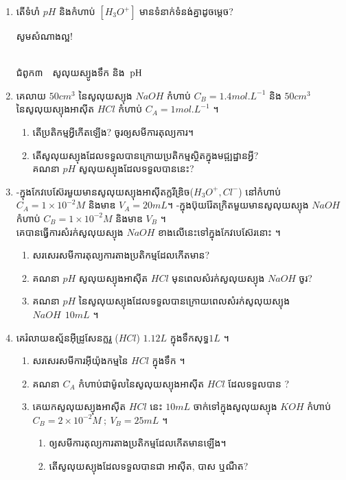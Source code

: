 \documentclass[12pt, a4paper]{article}
\begin{document}
\begin{enumerate}[m]
	\item តើទំហំ $pH$ និងកំហាប់ $\left[H_{3}O^{+}\right]$ មានទំនាក់ទំនង់គ្នាដូចម្តេច?   
	\begin{center}
		\sffamily\color{black}
		សូមសំណាងល្អ!
	\end{center}\newpage
		\begin{center}
			\sffamily\color{black}
			\\
			ជំពូក៣~~សូលុយស្យូងទឹក និង~$\ce{pH}$
		\end{center}
	\item គេលាយ $50cm^3$ នៃសូលុយស្យុង $NaOH$ កំហាប់ $C_B=1.4mol.L^{-1}$ និង $50cm^3$ នៃសូលុយស្យុងអាស៊ីត $HCl$ កំហាប់ $C_A=1mol.L^{-1}$ ។
	\begin{enumerate}[k]
		\item តើប្រតិកម្មអ្វីកើតឡើង? ចូរឲ្យសមីការតុល្យការ។
		\item តើសូលុយស្យុងដែលទទួលបានក្រោយប្រតិកម្មស្ថិតក្នុងមជ្ឍដ្ឋានអ្វី?\\
		គណនា $pH$ សូលុយស្យុងដែលទទួលបាននេះ?
	\end{enumerate}
	\item -ក្នុងកែវបេស៊ែរមួយមានសូលុយស្យុងអាស៊ីតក្លរីឌ្រិច($H_3O^+, Cl^-$) នៅកំហាប់ $C_A=1\times10^{-2}M$ និងមាឌ $V_A=20mL$។
	-ក្នុងប៊ុយរ៉ែតក្រិតមួយមានសូលុយស្យុង $NaOH$ កំហាប់ $C_B=1\times10^{-2}M$ និងមាឌ $V_B$ ។\\
	គេបានធ្វើការសំរក់សូលុយស្យុង $NaOH$ ខាងលើនេះទៅក្នុងកែវបេស៊ែរនោះ ។
	\begin{enumerate}[k]
		\item សរសេរសមីការតុល្យការតាងប្រតិកម្មដែលកើតមាន?
		\item គណនា $pH$ សូលុយស្យុងអាស៊ីត $HCl$ មុនពេលសំរក់សូលុយស្យុង $NaOH$ ចូរ?
		\item គណនា $pH$ នៃសូលុយស្យុងដែលទទួលបានក្រោយពេលសំរក់សូលុយស្យុង $NaOH~~10mL$ ។ 
	\end{enumerate}
	\item គេរំលាយឧស្ម័នអ៊ីដ្រូសែនក្លរួ ($HCl$) $1.12L$ ក្នុងទឹកសុទ្ធ$1L$ ។
	\begin{enumerate}[k]
		\item សរសេរសមីការអ៊ីយ៉ុងកម្មនៃ $HCl$ ក្នុងទឹក ។
		\item គណនា $C_A$ កំហាប់ជាម៉ូលនៃសូលុយស្យុងអាស៊ីត $HCl$ ដែលទទួលបាន ?
		\item គេយកសូលុយស្យុងអាស៊ីត $HCl$ នេះ $10mL$ ចាក់ទៅក្នុងសូលុយស្យុង $KOH$ កំហាប់ $C_B=2\times10^{-2}M~;~V_B=25mL$ ។
		\begin{enumerate}[m]
			\item ឲ្យសមីការតុល្យការតាងប្រតិកម្មដែលកើតមានឡើង។
			\item តើសូលុយស្យុងដែលទទួលបានជា អាស៊ីត, បាស ឬណឺត?\\

\end{enumerate}
\end{enumerate}
\end{enumerate}
\end{document}
